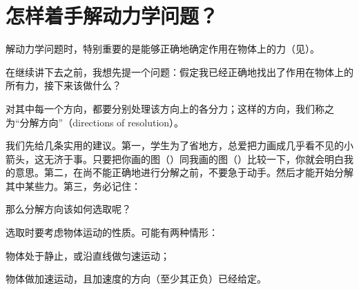 \chapter[怎样着手解动力学问题？]{怎样着手解动力学问题？\label{ch-06}}

\begin{dialogue}
\tchr 解动力学问题时，特别重要的是能够正确地确定作用在物体上的力（见）。

\std 在继续讲下去之前，我想先提一个问题：假定我已经正确地找出了作用在物体上的所有力，接下来该做什么？

\tchr {}对其中每一个方向，都要分别处理该方向上的各分力；这样的方向，我们称之为“分解方向”（directions of resolution）。

我们先给几条实用的建议。第一，学生为了省地方，总爱把力画成几乎看不见的小箭头，这无济于事。只要把你画的图（）同我画的图（）比较一下，你就会明白我的意思。第二，在尚不能正确地进行分解之前，不要急于动手。然后才能开始分解其中某些力。第三，务必记住：

\std 那么分解方向该如何选取呢？

\tchr 选取时要考虑物体运动的性质。可能有两种情形：
\begin{enumerate*}[label=(\arabic*)]
\item 物体处于静止，或沿直线做匀速运动；
\item 物体做加速运动，且加速度的方向（至少其正负）已经给定。
\end{enumerate*}


\end{dialogue}
